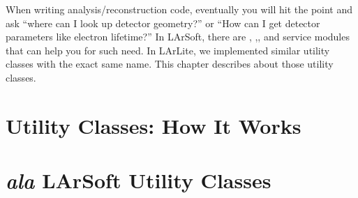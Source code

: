 When writing analysis/reconstruction code, eventually you will hit the point and ask ``where can I look up detector geometry?'' or ``How can I get detector parameters like electron lifetime?'' In LArSoft, there are \Geometry, \LArProperties,\DetectorProperties, and \GeometryUtilities service modules that can help you for such need. In LArLite, we implemented similar utility classes with the exact same name. This chapter describes about those utility classes.

\section{Utility Classes: How It Works}
\label{sec:utilbasic}


\section{{\it ala} LArSoft Utility Classes}
\label{sec:utilities}




